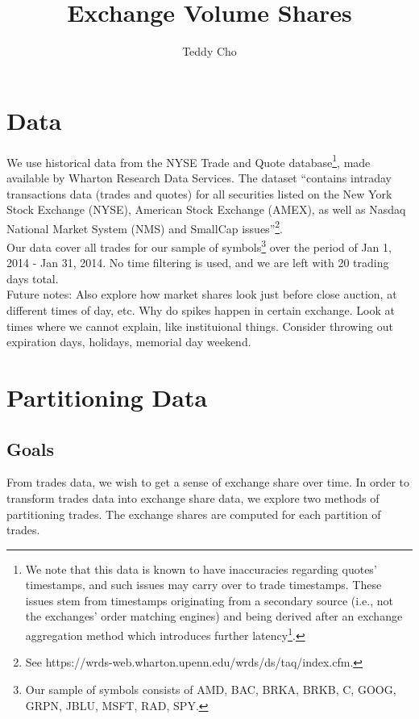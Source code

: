 \documentclass{article}
\begin{document}
\title{Exchange Volume Shares} \author{Teddy Cho}

\maketitle
\vspace{.5pc}

\section{Data}
We use historical data from the NYSE Trade and Quote database\footnote{We note that this data is known to have inaccuracies regarding quotes' timestamps, and such issues may carry over to trade timestamps. These issues stem from timestamps originating from a secondary source (i.e., not the exchanges' order matching engines) and being derived after an exchange aggregation method which introduces further latency\footnote{See Budish, Cramton and Shim (2015) and Ding, Hanna and Hendershott (2014)}.}, made available by Wharton Research Data Services. The dataset ``contains intraday transactions data (trades and quotes) for all securities listed on the New York Stock Exchange (NYSE), American Stock Exchange (AMEX), as well as Nasdaq National Market System (NMS) and SmallCap issues''\footnote{See https://wrds-web.wharton.upenn.edu/wrds/ds/taq/index.cfm.}.\\

Our data cover all trades for our sample of symbols\footnote{Our sample of symbols consists of AMD, BAC, BRKA, BRKB, C, GOOG, GRPN, JBLU, MSFT, RAD, SPY.} over the period of Jan 1, 2014 - Jan 31, 2014. No time filtering is used, and we are left with 20 trading days total.\\

Future notes: Also explore how market shares look just before close auction, at different times of day, etc. Why do spikes happen in certain exchange. Look at times where we cannot explain, like instituional things. Consider throwing out expiration days, holidays, memorial day weekend.\\

\section{Partitioning Data}
\subsection{Goals}
From trades data, we wish to get a sense of exchange share over time. In order to transform trades data into exchange share data, we explore two methods of partitioning trades. The exchange shares are computed for each partition of trades.\\
\end{document}
